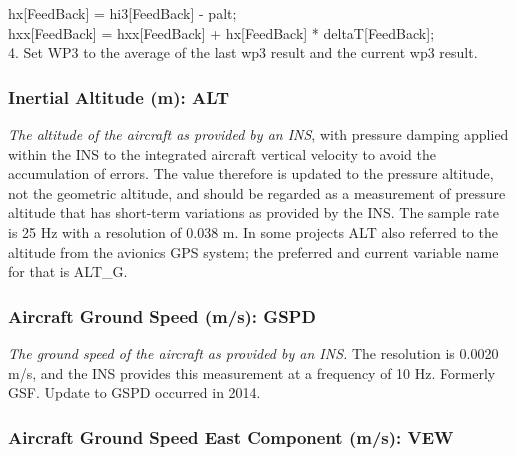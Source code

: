 \documentclass[
]{book}
\begin{document}
\hspace*{0.333em}\hspace*{0.333em}\hspace*{0.333em}\hspace*{0.333em}\hspace*{0.333em}hx{[}FeedBack{]} = hi3{[}FeedBack{]} - palt;\\
\hspace*{0.333em}\hspace*{0.333em}\hspace*{0.333em}\hspace*{0.333em}\hspace*{0.333em}hxx{[}FeedBack{]} = hxx{[}FeedBack{]} + hx{[}FeedBack{]} * deltaT{[}FeedBack{]};\\
\hspace*{0.333em}4. Set WP3 to the average of the last wp3 result and the current wp3
result.

\hypertarget{alt}{%
\subsubsection*{Inertial Altitude (m): ALT}\label{alt}}

\emph{The altitude of the aircraft as provided by an INS}, with pressure damping applied within the INS to the integrated aircraft vertical velocity to avoid the accumulation of errors. The value therefore is updated to the pressure altitude, not the geometric altitude, and should be regarded as a measurement of pressure altitude that has short-term variations as provided by the INS. The sample rate is 25 Hz with a resolution of 0.038 m. In some projects ALT also referred to the altitude from the avionics GPS system; the preferred and current variable name for that is ALT\_G.

\hypertarget{gsf}{%
\subsubsection*{Aircraft Ground Speed (m/s): GSPD}\label{gsf}}

\emph{The ground speed of the aircraft as provided by an INS.} The resolution is 0.0020 m/s, and the INS provides this measurement at a frequency of 10 Hz. Formerly GSF. Update to GSPD occurred in 2014.

\hypertarget{vew}{%
\subsubsection*{Aircraft Ground Speed East Component (m/s): VEW}\label{vew}}
\end{document}
